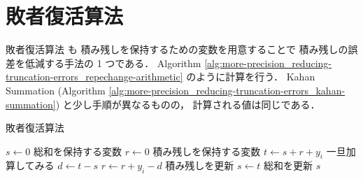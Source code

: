 \section{敗者復活算法}

敗者復活算法 \cite{Togawa2007} も
積み残しを保持するための変数を用意することで
積み残しの誤差を低減する手法の 1 つである．
Algorithm \ref{alg:more-precision_reducing-truncation-errors_repechange-arithmetic}
のように計算を行う．
Kahan Summation (Algorithm \ref{alg:more-precision_reducing-truncation-errors_kahan-summation})
と少し手順が異なるものの，
計算される値は同じである．

\begin{algorithm}[tbp]
    \caption{敗者復活算法 \cite{Togawa2007}}
    \label{alg:more-precision_reducing-truncation-errors_repechange-arithmetic}
    \begin{algorithmic}
        \State $s \gets 0$
        \Comment 総和を保持する変数
        \State $r \gets 0$
        \Comment 積み残しを保持する変数
        \State $t \gets s + r + y_i$
        \Comment 一旦加算してみる
        \State $d \gets t - s$
        \State $r \gets r + y_i - d$
        \Comment 積み残しを更新
        \State $s \gets t$
        \Comment 総和を更新
        \EndFor
        \State \Return $s$
        \EndProcedure
    \end{algorithmic}
\end{algorithm}
